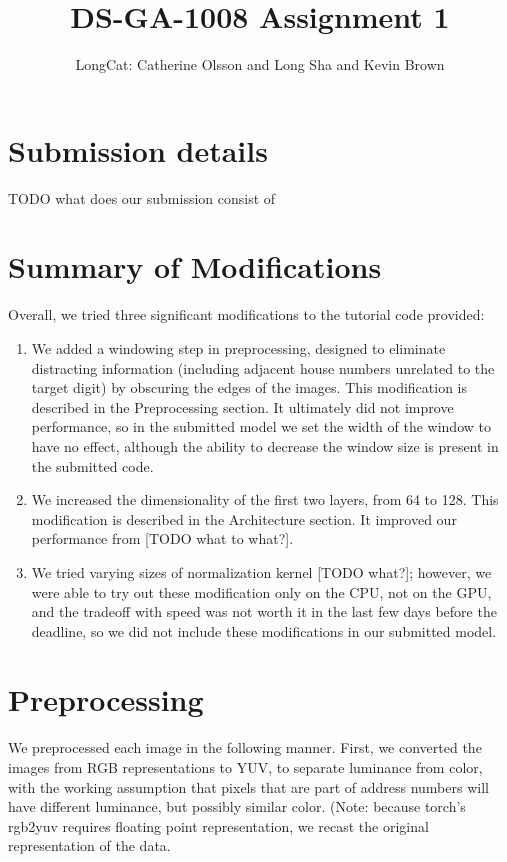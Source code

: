 \documentclass{article}
\title{DS-GA-1008 Assignment 1}
\author{LongCat: Catherine Olsson and Long Sha and Kevin Brown}
\begin{document}
\maketitle


\section{Submission details}

TODO what does our submission consist of

\section{Summary of Modifications}

Overall, we tried three significant modifications to the tutorial code provided:
\begin{enumerate}
\item We added a windowing step in preprocessing, designed to eliminate distracting information (including adjacent house numbers unrelated to the target digit) by obscuring the edges of the images. This modification is described in the Preprocessing section. It ultimately did not improve performance, so in the submitted model we set the width of the window to have no effect, although the ability to decrease the window size is present in the submitted code.
\item We increased the dimensionality of the first two layers, from 64 to 128. This modification is described in the Architecture section. It improved our performance from [TODO what to what?].
\item We tried varying sizes of normalization kernel [TODO what?]; however, we were able to try out these modification only on the CPU, not on the GPU, and the tradeoff with speed was not worth it in the last few days before the deadline, so we did not include these modifications in our submitted model.
\end{enumerate}

\section{Preprocessing}
\label{preprocessing}

We preprocessed each image in the following manner. First, we converted the
images from RGB representations to YUV, to separate luminance from color, with
the working assumption that pixels that are part of address numbers will have
different luminance, but possibly similar color. (Note: because torch's rgb2yuv
requires floating point representation, we recast the original representation of
the data. \\
\end{document}

